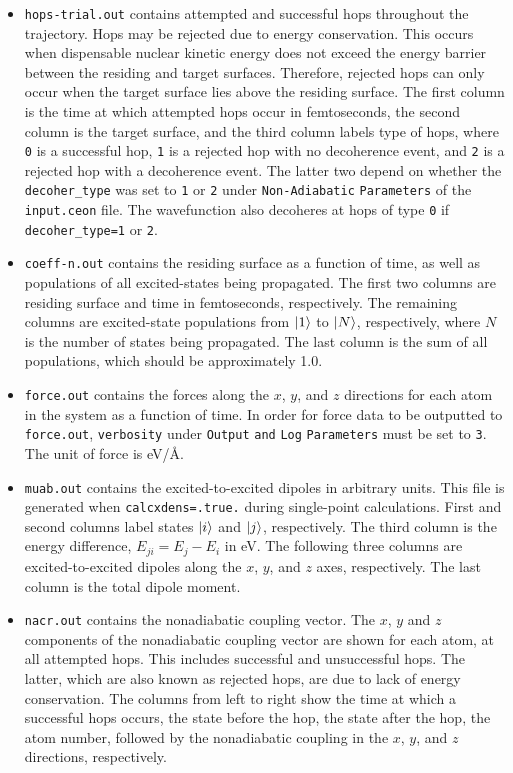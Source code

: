 \documentclass[letterpaper,12pt,titlepage]{article}
\begin{document}
\begin{itemize}
\item \verb+hops-trial.out+ contains attempted and successful hops throughout the trajectory.  Hops may be rejected due to energy conservation.  This occurs when dispensable nuclear kinetic energy does not exceed the energy barrier between the residing and target surfaces.  Therefore, rejected hops can only occur when the target surface lies above the residing surface.  The first column is the time at which attempted hops occur in femtoseconds, the second column is the target surface, and the third column labels type of hops, where \verb+0+ is a successful hop, \verb+1+ is a rejected hop with no decoherence event, and \verb+2+ is a rejected hop with a decoherence event.  The latter two depend on whether the \verb+decoher_type+ was set to \verb+1+ or \verb+2+ under \verb+Non-Adiabatic+ \verb+Parameters+ of the \verb+input.ceon+ file.  The wavefunction also decoheres at hops of type \verb+0+ if \verb+decoher_type=1+ or \verb+2+.
\item \verb+coeff-n.out+ contains the residing surface as a function of time, as well as populations of all excited-states being propagated.  The first two columns are residing surface and time in femtoseconds, respectively.  The remaining columns are excited-state populations from $\ket{1}$ to $\ket{N}$, respectively, where $N$ is the number of states being propagated.  The last column is the sum of all populations, which should be approximately 1.0.
\item \verb+force.out+ contains the forces along the $x$, $y$, and $z$ directions for each atom in the system as a function of time.  In order for force data to be outputted to \verb+force.out+, \verb+verbosity+ under \verb+Output+ \verb+and+ \verb+Log+ \verb+Parameters+ must be set to \verb+3+.  The unit of force is eV/\AA.
\item \verb+muab.out+ contains the excited-to-excited dipoles in arbitrary units.  This file is generated when \verb+calcxdens=.true.+ during single-point calculations.  First and second columns label states $\ket{i}$ and $\ket{j}$, respectively.  The third column is the energy difference, $E_{ji} = E_{j}-E_{i}$ in eV.  The following three columns are excited-to-excited dipoles along the $x$, $y$, and $z$ axes, respectively.  The last column is the total dipole moment.
\item \verb+nacr.out+ contains the nonadiabatic coupling vector.  The $x$, $y$ and $z$ components of the nonadiabatic coupling vector are shown for each atom, at all attempted hops.  This includes successful and unsuccessful hops.  The latter, which are also known as rejected hops, are due to lack of energy conservation. The columns from left to right show the time at which a successful hops occurs, the state before the hop, the state after the hop, the atom number, followed by the nonadiabatic coupling in the $x$, $y$, and $z$ directions, respectively.

\end{itemize}
\end{document}
